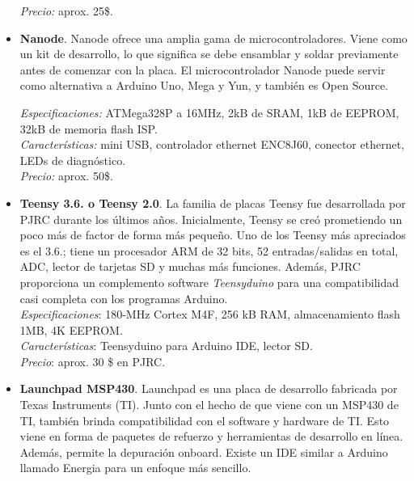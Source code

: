 \documentclass[12pt]{article}
\begin{document}
\begin{itemize}
		\textit{Precio:} aprox. 25\$.\\
		
		\item \textbf{Nanode}. Nanode ofrece una amplia gama de microcontroladores. Viene como un kit de desarrollo, lo que significa se debe ensamblar y soldar previamente antes de comenzar con la placa. 	El microcontrolador Nanode puede servir como alternativa a Arduino Uno, Mega y Yun, y también es Open Source.
		
		\textit{Especificaciones:} ATMega328P a 16MHz, 2kB de SRAM, 1kB de EEPROM, 32kB de memoria flash ISP.\\
		
		\textit{Características:} mini USB, controlador ethernet ENC8J60, conector ethernet, LEDs de diagnóstico.\\
		
		\textit{Precio:} aprox. 50\$.\\
		
		\item \textbf{Teensy 3.6. o Teensy 2.0}. La familia de placas Teensy fue desarrollada por PJRC durante los últimos años. Inicialmente, Teensy se creó prometiendo un poco más de factor de forma más pequeño. Uno de los Teensy más apreciados es el 3.6.; tiene un procesador ARM de 32 bits, 52 entradas/salidas en total, ADC, lector de tarjetas SD y muchas más funciones. Además, PJRC proporciona un complemento software \textit{Teensyduino} para una compatibilidad casi completa con los programas Arduino. \\ 
		
		\textit{Especificaciones}: 180-MHz Cortex M4F, 256 kB RAM, almacenamiento flash 1MB, 4K EEPROM. \\
		
		\textit{Características}: Teensyduino para Arduino IDE, lector SD. \\
		
		\textit{Precio}: aprox. 30 \$ en PJRC. \\
		
		\item \textbf{Launchpad MSP430}. Launchpad es una placa de desarrollo fabricada por Texas Instruments (TI). Junto con el hecho de que viene con un MSP430 de TI, también brinda compatibilidad con el software y hardware de TI. Esto viene en forma de paquetes de refuerzo y herramientas de desarrollo en línea. Además, permite la depuración onboard. Existe un IDE similar a Arduino llamado Energia para un enfoque más sencillo. \\
		

\end{itemize}
\end{document}
